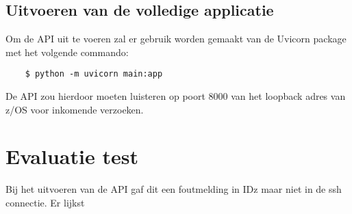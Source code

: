 \section{Uitvoeren van de volledige applicatie}
Om de API uit te voeren zal er gebruik worden gemaakt van de Uvicorn package met het volgende commando:

\begin{lstlisting}
    $ python -m uvicorn main:app
\end{lstlisting}

De API zou hierdoor moeten luisteren op poort 8000 van het loopback adres van z/OS voor inkomende verzoeken. 


\chapter{Evaluatie test}
\label{ch:eval-test}
Bij het uitvoeren van de API gaf dit een foutmelding in IDz maar niet in de ssh connectie. Er lijkst







